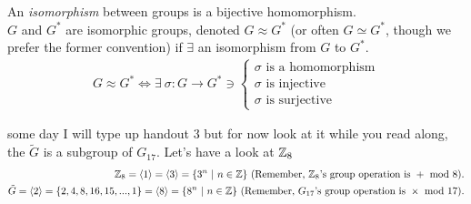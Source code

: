 \begin{definition}[Isomorphism]
An \textit{isomorphism} between groups is a bijective homomorphism. \steezybreak\\
$G$ and $G^*$ are isomorphic groups, denoted $G\approx G^*$ (or often $G\simeq G^*$, though we prefer the former convention) if $\exists$ an isomorphism from $G$ to $G^*$.
\begin{align}
    G\approx G^* \iff \exists \ \sigma: G\rightarrow G^* \ni 
    \begin{cases}
      \sigma \text{ is a homomorphism}\\
      \sigma \text{ is injective}\\
      \sigma \text{ is surjective}
    \end{cases} \nonumber 
\end{align}
\end{definition}
some day I will type up handout 3 but for now look at it while you read along, the $\tilde{G}$ is a subgroup of $G_{17}$. Let's have a look at ${\mathbb{ Z}}_8$
\begin{align}
    \Z_8=\langle 1 \rangle =\langle 3 \rangle = \{3^n\ | \ n\in \Z \} \ (\text{Remember, }\Z_8\text{'s group operation is } + \text{ mod }8).\nonumber\\
    \tilde{G}=\langle 2 \rangle = \{2,4,8,16,15,...,1\}=\langle 8 \rangle = \{8^n\ | \ n\in \Z\} \ (\text{Remember, }G_{17}\text{'s group operation is } \times \text{ mod }17).\nonumber
\end{align}
\newpage
